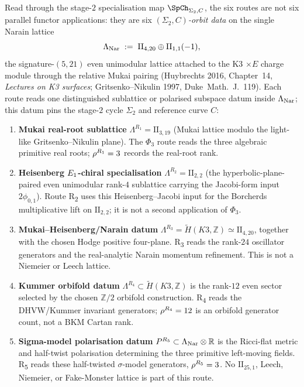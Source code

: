 \begin{remark}
\label{rem:r1-r6-narain-orbit-decomposition}
Read through the stage-$2$ specialisation map $\SpCh_{\Sigma_2, C}$, the six routes are not six parallel functor applications: they are six \emph{$(\Sigma_2, C)$-orbit data} on the single Narain lattice
\[
 \Lambda_{\mathrm{Nar}} \;:=\; \mathrm{II}_{4, 20} \oplus \mathrm{II}_{1, 1}(-1),
\]
the signature-$(5, 21)$ even unimodular lattice attached to the K3 $\times E$ charge module through the relative Mukai pairing (Huybrechts 2016, Chapter~14, \emph{Lectures on K3 surfaces}; Gritsenko--Nikulin 1997, Duke~Math.~J.~119). Each route reads one distinguished sublattice or polarised subspace datum inside $\Lambda_{\mathrm{Nar}}$; this datum pins the stage-$2$ cycle $\Sigma_2$ and reference curve $C$:
\begin{enumerate}[label=\textbf{R\arabic*.}]
 \item \textbf{Mukai real-root sublattice} $\Lambda^{R_1} = \mathrm{II}_{3, 19}$ (Mukai lattice modulo the light-like Gritsenko--Nikulin plane). The $\Phi_3$ route reads the three algebraic primitive real roots; $\rho^{R_1} = 3$ records the real-root rank.
 \item \textbf{Heisenberg $E_{1}$-chiral specialisation} $\Lambda^{R_2} = \mathrm{II}_{2, 2}$ (the hyperbolic-plane-paired even unimodular rank-$4$ sublattice carrying the Jacobi-form input $2\phi_{0, 1}$). Route R\textsubscript{2} uses this Heisenberg--Jacobi input for the Borcherds multiplicative lift on $\mathrm{II}_{2, 2}$; it is not a second application of $\Phi_3$.
 \item \textbf{Mukai--Heisenberg/Narain datum} $\Lambda^{R_3}=\widetilde H(K3,\mathbb Z)\simeq \mathrm{II}_{4,20}$, together with the chosen Hodge positive four-plane. R\textsubscript{3} reads the rank-$24$ oscillator generators and the real-analytic Narain momentum refinement. This is not a Niemeier or Leech lattice.
 \item \textbf{Kummer orbifold datum} $\Lambda^{R_4}\subset \widetilde H(K3,\mathbb Z)$ is the rank-$12$ even sector selected by the chosen $\mathbb Z/2$ orbifold construction. R\textsubscript{4} reads the DHVW/Kummer invariant generators; $\rho^{R_4}=12$ is an orbifold generator count, not a BKM Cartan rank.
 \item \textbf{Sigma-model polarisation datum} $P^{R_5}\subset \Lambda_{\mathrm{Nar}}\otimes\mathbb R$ is the Ricci-flat metric and half-twist polarisation determining the three primitive left-moving fields. R\textsubscript{5} reads these half-twisted $\sigma$-model generators, $\rho^{R_5}=3$. No $\mathrm{II}_{25,1}$, Leech, Niemeier, or Fake-Monster lattice is part of this route.

\end{enumerate}
\end{remark}
